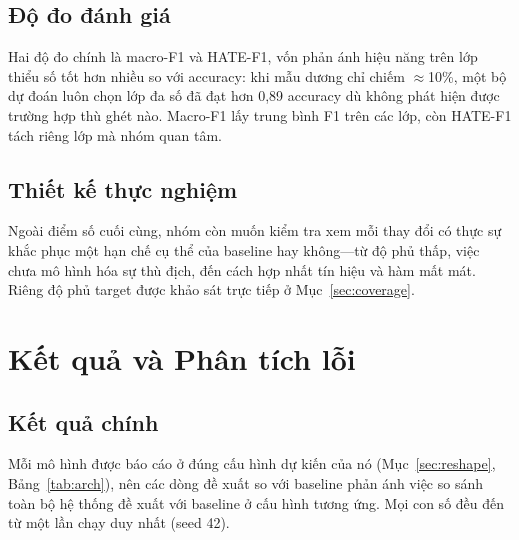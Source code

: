 \documentclass[11pt]{article}
\begin{document}
\subsection{Độ đo đánh giá}
Hai độ đo chính là macro-F1 và HATE-F1, vốn phản ánh hiệu năng trên lớp thiểu số tốt hơn nhiều so với accuracy: khi mẫu dương chỉ chiếm $\approx$10\%, một bộ dự đoán luôn chọn lớp đa số đã đạt hơn 0,89 accuracy dù không phát hiện được trường hợp thù ghét nào. Macro-F1 lấy trung bình F1 trên các lớp, còn HATE-F1 tách riêng lớp mà nhóm quan tâm.

\subsection{Thiết kế thực nghiệm}
Ngoài điểm số cuối cùng, nhóm còn muốn kiểm tra xem mỗi thay đổi có thực sự khắc phục một hạn chế cụ thể của baseline hay không---từ độ phủ thấp, việc chưa mô hình hóa sự thù địch, đến cách hợp nhất tín hiệu và hàm mất mát. Riêng độ phủ target được khảo sát trực tiếp ở Mục~\ref{sec:coverage}.

\section{Kết quả và Phân tích lỗi}

\subsection{Kết quả chính}

Mỗi mô hình được báo cáo ở đúng cấu hình dự kiến của nó (Mục~\ref{sec:reshape}, Bảng~\ref{tab:arch}), nên các dòng đề xuất so với baseline phản ánh việc so sánh toàn bộ hệ thống đề xuất với baseline ở cấu hình tương ứng. Mọi con số đều đến từ một lần chạy duy nhất (seed 42).
\end{document}
